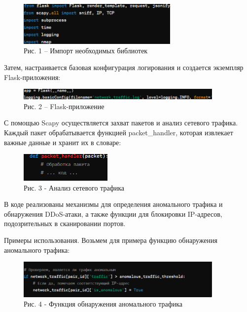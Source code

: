 \begin{figure}[H]
	\centering
	\includegraphics[width=0.7\textwidth]{assets/47}
	\caption*{Рис. 1 -- Импорт необходимых библиотек}
\end{figure}

Затем, настраивается базовая конфигурация логирования и создается
экземпляр Flask-приложения:

\begin{figure}[H]
	\centering
	\includegraphics[width=0.9\textwidth]{assets/48}
	\caption*{Рис. 2 -- Flask-приложение}
\end{figure}

С помощью Scapy осуществляется захват пакетов и анализ сетевого трафика.
Каждый пакет обрабатывается функцией packet\_handler, которая извлекает
важные данные и хранит их в словаре:

\begin{figure}[H]
	\centering
	\includegraphics[width=0.4\textwidth]{assets/49}
	\caption*{Рис. 3 - Анализ сетевого трафика}
\end{figure}

В коде реализованы механизмы для определения аномального трафика и
обнаружения DDoS-атаки, а также функции для блокировки IP-адресов,
подозрительных в сканировании портов.

Примеры использования. Возьмем для примера функцию обнаружения
аномального трафика:

\begin{figure}[H]
	\centering
	\includegraphics[width=0.9\textwidth]{assets/50}
	\caption*{Рис. 4 - Функция обнаружения аномального трафика}
\end{figure}

